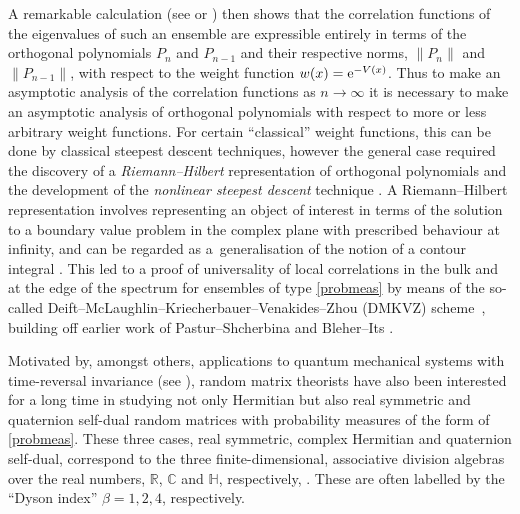 \documentclass[pdftex]{sigma}
\numberwithin{equation}{section}
\begin{document}
A remarkable calculation (see \cite[Chapter~5]{mehta} or \cite[Chapter~5]{loggases}) then shows that the correlation functions of the eigenvalues of such an ensemble are expressible entirely in terms of the orthogonal polynomials $P_n$ and $P_{n-1}$ and their respective norms, $\| P_n \|$ and $\| P_{n-1} \|$, with respect to the weight function $w(x) = {\rm e}^{-V(x)}$. Thus to make an asymptotic analysis of the correlation functions as $n \to \infty$ it is necessary to make an asymptotic analysis of orthogonal polynomials with respect to more or less arbitrary weight functions. For certain \enquote{classical} weight functions, this can be done by classical steepest descent techniques, however the general case required the discovery of a \textit{Riemann--Hilbert} representation of orthogonal polynomials \cite{fokas} and the development of the \textit{nonlinear steepest descent} technique \cite{10.2307/2946540}. A Riemann--Hilbert representation involves representing an object of interest in terms of the solution to a boundary value problem in the complex plane with prescribed behaviour at infinity, and can be regarded as a~generalisation of the notion of a contour integral \cite{itsRH}. This led to a proof of universality of local correlations in the bulk and at the edge of the spectrum for ensembles of type \eqref{probmeas} by means of the so-called Deift--McLaughlin--Kriecherbauer--Venakides--Zhou (DMKVZ) scheme~\mbox{\cite{deift,deift2,deift3}}, building off earlier work of Pastur--Shcherbina \cite{Pastur:1997aa} and Bleher--Its \cite{Its}.

Motivated by, amongst others, applications to quantum mechanical systems with time-re\-ver\-sal invariance (see \cite[Chapter 2]{mehta}), random matrix theorists have also been interested for a long time in studying not only Hermitian but also real symmetric and quaternion self-dual random matrices with probability measures of the form of \eqref{probmeas}. These three cases, real symmetric, complex Hermitian and quaternion self-dual, correspond to the three finite-dimensional, associative division algebras over the real numbers, $\mathbb{R}$, $\mathbb{C}$ and $\mathbb{H}$, respectively, \cite{Dyson3}. These are often labelled by the \enquote{Dyson index} $\beta=1,2,4$, respectively.
\end{document}
